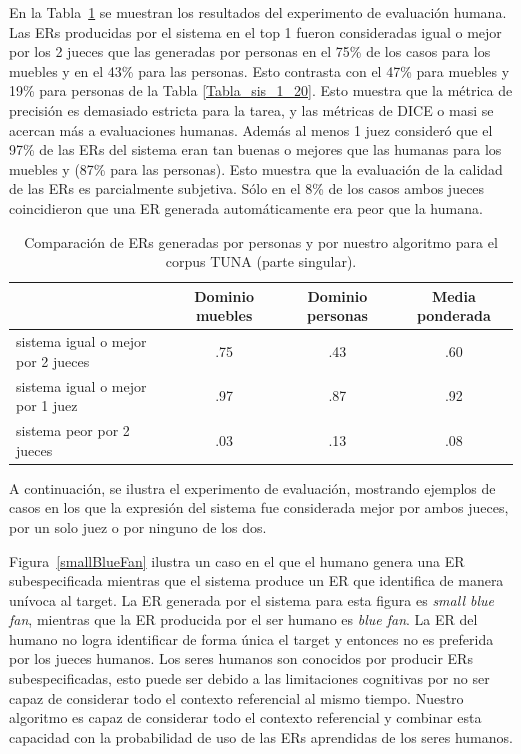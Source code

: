 En la Tabla~\ref{system-versus-human} se muestran los resultados del experimento de evaluaci\'on humana.
Las ERs producidas por el sistema en el top 1 fueron consideradas igual o mejor por los 2 jueces que las generadas por personas en el 75\% de los casos para los muebles y en el 43\% para las personas. Esto contrasta con el 47\% para muebles y 19\% para personas de la Tabla \ref{Tabla_sis_1_20}. Esto muestra que la m\'etrica de precisi\'on es demasiado estricta para la tarea, y las m\'etricas de DICE o masi se acercan m\'as a evaluaciones humanas. Adem\'as al menos 1 juez consider\'o que el 97\% de las ERs del sistema eran tan buenas o mejores que las humanas para los muebles y (87\% para las personas). Esto muestra que la evaluaci\'on de la calidad de las ERs es parcialmente subjetiva. S\'olo en el 8\% de los casos ambos jueces coincidieron que una ER generada autom\'aticamente era peor que la humana.

\begin{table}[h]
\begin{center}
\begin{tabular}{|l|c|c|c|}
\hline

 & Dominio muebles & Dominio personas & Media ponderada \\
\hline
sistema igual o mejor por 2 jueces  &.75  &       .43	&       .60 \\
sistema igual o mejor por 1 juez  &.97	&	.87	&	.92 \\
sistema peor por 2 jueces &	.03	&	.13	&	.08 \\
\hline
\end{tabular}
\caption{Comparaci\'on de ERs generadas por personas y por nuestro algoritmo para el corpus TUNA (parte singular).} 
\label{system-versus-human}
\vspace*{-.5cm}
\end{center}
\end{table}

A continuaci\'on, se ilustra el experimento de evaluaci\'on, mostrando ejemplos de casos en los que la expresi\'on del sistema fue considerada mejor por ambos jueces, por un solo juez o por ninguno de los dos.

Figura~\ref{smallBlueFan} ilustra un caso en el que el humano genera una ER subespecificada mientras que el sistema produce un ER que identifica de manera un\'{i}voca al target. La ER generada por el sistema para esta figura es {\it small blue fan}, mientras que la ER producida por el ser humano es {\it blue fan}. La ER del humano no logra identificar de forma \'unica el target y entonces no es preferida por los jueces humanos. Los seres humanos son conocidos por producir ERs subespecificadas, esto puede ser debido a las limitaciones cognitivas por no ser capaz de considerar todo el contexto referencial al mismo tiempo. Nuestro algoritmo es capaz de considerar todo el contexto referencial y combinar esta capacidad con la probabilidad de uso de las ERs aprendidas de los seres humanos.

